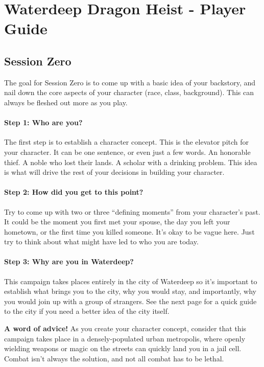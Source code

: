 \documentclass[10pt,twoside,twocolumn,openany,bg=print]{dndbook}
\begin{document}
\chapter{Waterdeep Dragon Heist - Player Guide}

\section{Session Zero}

The goal for Session Zero is to come up with a basic idea of your backstory, and nail down the core aspects of your character (race, class, background). This can always be fleshed out more as you play.

\subsubsection{Step 1: Who are you?}
The first step is to establish a character concept. This is the elevator pitch for your character. It can be one sentence, or even just a few words. An honorable thief. A noble who lost their lands. A scholar with a drinking problem. This idea is what will drive the rest of your decisions in building your character.

\subsubsection{Step 2: How did you get to this point?}
Try to come up with two or three “defining moments” from your character’s past. It could be the moment you first met your spouse, the day you left your hometown, or the first time you killed someone. It’s okay to be vague here. Just try to think about what might have led to who you are today.

\subsubsection{Step 3: Why are you in Waterdeep?}
This campaign takes places entirely in the city of Waterdeep so it’s important to establish what brings you to the city, why you would stay, and importantly, why you would join up with a group of strangers. See the next page for a quick guide to the city if you need a better idea of the city itself.

\begin{quotebox}
    \textbf{A word of advice!} As you create your character concept, consider that this campaign takes place in a densely-populated urban metropolis, where openly wielding weapons or magic on the streets can quickly land you in a jail cell. Combat isn’t always the solution, and not all combat has to be lethal.
\end{quotebox}
\end{document}
